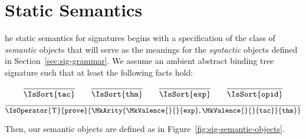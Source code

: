 \section{Static Semantics}
\label{sec:sig-statics}

\newcommand\SemSym{\mathrm{Sym}}
\newcommand\SemMetavar{\mathrm{Metavar}}
\newcommand\SemOpid{\mathrm{Opid}}
\newcommand\SemSig{\mathrm{Sig}}
\newcommand\SemParams{\mathrm{Params}}
\newcommand\SemArgs{\mathrm{Args}}
\newcommand\SemTerm[3]{\mathrm{Tm}(#1,#2,#3)}
\newcommand\SemSort{\mathrm{Sort}}
\newcommand\SemProdValence{\mathrm{ProdValence}}
\newcommand\SemDecl{\mathrm{Decl}}
\newcommand\Partial[2]{#1\rightharpoonup #2}
\newcommand\FinArr[2]{#1\xrightarrow{\mathrm{fin}} #2}

\newcommand\SemExprs{\mathbf{E}}
\newcommand\AbtSortTac{\mathtt{tac}}
\newcommand\AbtSortThm{\mathtt{thm}}
\newcommand\AbtSortExp{\mathtt{exp}}
\newcommand\AbtSortOpid{\mathtt{opid}}
\newcommand\OpProve{\mathtt{prove}}

\newcommand\OpCust

The static semantics for \RedPRL{} signatures begins with a specification of
the class of \emph{semantic} objects that will serve as the meanings for the
\emph{syntactic} objects defined in Section~\ref{sec:sig-grammar}. We assume an
ambient abstract binding tree signature such that at least the following facts
hold:

\[
  \infer{
    \IsSort{\AbtSortTac}
  }{
  }
  \qquad
  \infer{
    \IsSort{\AbtSortThm}
  }{
  }
  \qquad
  \infer{
    \IsSort{\AbtSortExp}
  }{
  }
  \qquad
  \infer{
    \IsSort{\AbtSortOpid}
  }{
  }
\]
\[
  \infer{
    \IsOperator{\Upsilon}{\OpProve}{
      \MkArity{
        \MkValence{}{}{\AbtSortExp},
        \MkValence{}{}{\AbtSortTac}
      }{\AbtSortThm}
    }
  }{
  }
\]

Then, our semantic objects are defined as in Figure~\ref{fig:sig-semantic-objects}.

